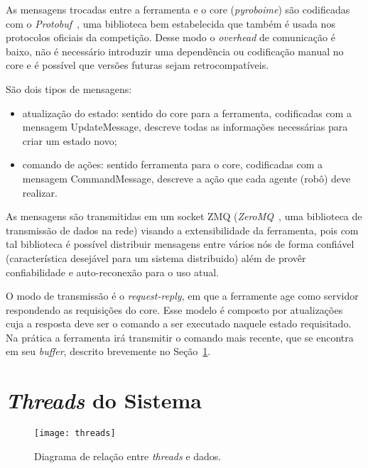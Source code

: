 As mensagens trocadas entre a ferramenta e o core (\textit{pyroboime}) são
codificadas com o \textit{Protobuf}~\cite{protobufdocs}, uma biblioteca bem
estabelecida que também é usada nos protocolos oficiais da competição.  Desse
modo o \textit{overhead} de comunicação é baixo, não é necessário introduzir uma
dependência ou codificação manual no core e é possível que versões futuras sejam
retrocompatíveis.

São dois tipos de mensagens:

\begin{itemize}
  \item atualização do estado: sentido do core para a ferramenta, codificadas
    com a mensagem UpdateMessage, descreve todas as informações necessárias para
    criar um estado novo;
  \item comando de ações: sentido ferramenta para o core, codificadas com a
    mensagem CommandMessage, descreve a ação que cada agente (robô) deve
    realizar.
\end{itemize}


As mensagens são transmitidas em um socket ZMQ (\textit{ZeroMQ}~\cite{zmqdocs},
uma biblioteca de transmissão de dados na rede) visando a extensibilidade da
ferramenta, pois com tal biblioteca é possível distribuir mensagens entre vários
nós de forma confiável (característica desejável para um sistema distribuido)
além de provêr confiabilidade e auto-reconexão para o uso atual.

O modo de transmissão é o \textit{request-reply}, em que a ferramente age como
servidor respondendo as requisições do core. Esse modelo é composto por
atualizações cuja a resposta deve ser o comando a ser executado naquele estado
requisitado.  Na prática a ferramenta irá transmitir o comando mais recente,
que se encontra em seu \textit{buffer}, descrito brevemente no
Seção~\ref{sec:threads}.

\section{\textit{Threads} do Sistema}\label{sec:threads}

\begin{figure}[H]
  \centering
  \texttt{[image: threads]}
  \caption{Diagrama de relação entre \textit{threads} e
  dados.}\label{fig:arch_threads}
\end{figure}


